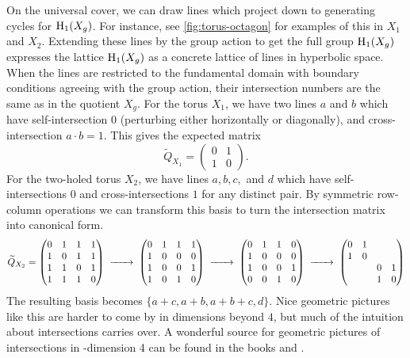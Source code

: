 \begin{example}
	On the universal cover, we can draw lines which project down to generating cycles for $\operatorname{H}_1(X_g)$. For instance, see \cref{fig:torus-octagon} for examples of this in $X_1$ and $X_2$. Extending these lines by the group action to get the full group $\operatorname{H}_1(X_g)$ expresses the lattice $\operatorname{H}_1(X_g)$ as a concrete lattice of lines in hyperbolic space.
	When the lines are restricted to the fundamental domain with boundary conditions agreeing with the group action, their intersection numbers are the same as in the quotient $X_g$. For the torus $X_1$, we have two lines $a$ and $b$ which have self-intersection $0$ (perturbing either horizontally or diagonally), and cross-intersection $a\cdot b = 1$. This gives the expected matrix
	\[
		\widetilde{Q}_{X_1}=\begin{pmatrix}0 & 1\\ 1 & 0\end{pmatrix}.
	\]
	For the two-holed torus $X_2$, we have lines $a,b,c,$ and $d$ which have self-intersections $0$ and cross-intersections $1$ for any distinct pair. By symmetric row-column operations we can transform this basis to turn the intersection matrix into canonical form.
	\[
		\widetilde{Q}_{X_2} =
		\begin{pmatrix}
			0 & 1 & 1 & 1 \\
			1 & 0 & 1 & 1 \\
			1 & 1 & 0 & 1 \\
			1 & 1 & 1 & 0
		\end{pmatrix}
		\lkxto
		\begin{pmatrix}
			0 & 1 & 1 & 1 \\
			1 & 0 & 0 & 0 \\
			1 & 0 & 0 & 1 \\
			1 & 0 & 1 & 0
		\end{pmatrix}
		\lkxto
		\begin{pmatrix}
			0 & 1 & 1 & 0 \\
			1 & 0 & 0 & 0 \\
			1 & 0 & 0 & 1 \\
			0 & 0 & 1 & 0
		\end{pmatrix}
		\lkxto
		\begin{pmatrix}
			0 & 1 &   &   \\
			1 & 0 &   &   \\
			  &   & 0 & 1 \\
			  &   & 1 & 0
		\end{pmatrix}
	\]
	The resulting basis becomes $\{a+c, a+b,a+b+c,d\}$. Nice geometric pictures like this are harder to come by in dimensions beyond $4$, but much of the intuition about intersections carries over. A wonderful source for geometric pictures of intersections in -dimension 4 can be found in the books \cite{behrens2021discembedding} and \cite{scorpan2005wild}.
\end{example}


